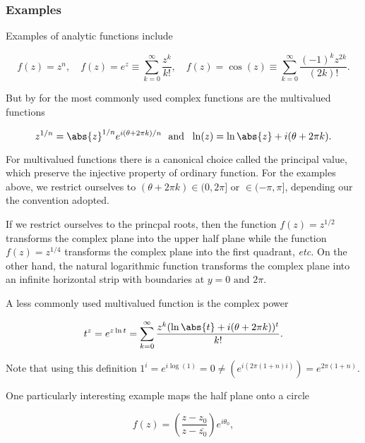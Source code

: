 \documentclass[english,a4paper,12pt]{report}
\begin{document}
\subsubsection{Examples}

Examples of analytic functions include 

\begin{equation}
    f(z) = z^{n}, \quad f(z) = e^{z} \equiv \sum_{k=0}^{\infty} \frac{z^{k} }{k!}, \quad f(z) = \cos (z) \equiv \sum_{k=0}^{\infty} \frac{(-1)^{k}z^{2k}  }{(2k)!}.   
\end{equation}

But by for the most commonly used complex functions are the multivalued functions

\begin{equation}
    z^{1 /n } = \abs{z}^{1 /n}  e^{i(\theta + 2\pi k) /n} ~\text { and }~ \ln (z) = \ln \abs{z} + i (\theta + 2\pi k).
\end{equation}

For multivalued functions there is a canonical choice called the principal value, which preserve the injective property of ordinary function. For the examples above, we restrict ourselves to \((\theta +2\pi k) \in (0,2\pi ] \text { or } \in (-\pi ,\pi ]\), depending our the convention adopted. 

If we restrict ourselves to the princpal roots, then the function \(f(z) = z ^{1 /2} \) transforms the complex plane into the upper half plane while the function \(f(z) = z^{1 /4} \) transforms the complex plane into the first quadrant, \textit{etc.} On the other hand, the natural logarithmic function transforms the complex plane into an infinite horizontal strip with boundaries at \(y = 0 \text { and } 2\pi\).   

A less commonly used multivalued function is the complex power

\begin{equation}
    t^{z} = e^{z \ln t} = \sum_{k=0}^{\infty} \frac{z^{k} (\ln \abs{t} + i(\theta +2\pi k) )^{t} }{k!}.
\end{equation}

Note that using this definition \(1^{i} = e^{i \log (1)} = 0 \neq (e^{i(2\pi (1+n)i)} ) = e^{2\pi (1+n)} \). 

One particularly interesting example maps the half plane onto a circle

\begin{equation}
    f(z) = \left( \frac{z-z_0 }{z-\overline{z_0} }  \right) e^{i \theta _{0} },
\end{equation}
\end{document}
